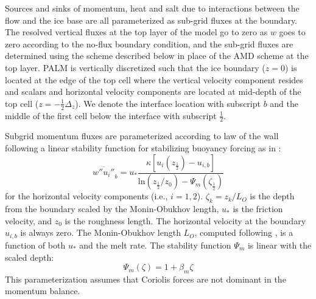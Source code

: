 \documentclass[draft]{styles/agujournal2019}
\begin{document}
Sources and sinks of momentum, heat and salt due to interactions between the flow and the ice base are all parameterized as sub-grid fluxes at the boundary. The resolved vertical fluxes at the top layer of the model go to zero as $w$ goes to zero according to the no-flux boundary condition, and the sub-grid fluxes are determined using the scheme described below in place of the AMD scheme at the top layer. PALM is vertically discretized such that the ice boundary ($z=0$) is located at the edge of the top cell where the vertical velocity component resides and scalars and horizontal velocity components are located at mid-depth of the top cell ($z=-\frac{1}{2}\Delta_z$). We denote the interface location with subscript $b$ and the middle of the first cell below the interface with subscript $\frac{1}{2}$.

Subgrid momentum fluxes are parameterized according to law of the wall following a linear stability function for stabilizing buoyancy forcing as in :
%
\begin{equation} \label{eq:tau}
    \overline{w''u_i''}_b = u_* \frac{ \kappa \left[u_i\left(z_{\frac{1}{2}}\right) - u_{i,b} \right]}{\textrm{ln}\left(z_{\frac{1}{2}}/z_0\right)-\Psi_m\left(\zeta_{\frac{1}{2}}\right)}
\end{equation}
%
for the horizontal velocity components (i.e., $i=1,2$). $\zeta_k = z_k/L_O$ is the depth from the boundary scaled by the Monin-Obukhov length, $u_*$ is the friction velocity, and $z_0$ is the roughness length. The horizontal velocity at the boundary $u_{i,b}$ is always zero. The Monin-Obukhov length $L_O$, computed following , is a function of both $u_*$ and the melt rate. The stability function $\Psi_m$ is linear with the scaled depth:
\begin{equation}\label{eq:psi}
    \Psi_m(\zeta) = 1 + \beta_m \zeta
\end{equation}
This parameterization assumes that Coriolis forces are not dominant in the momentum balance.
\end{document}
